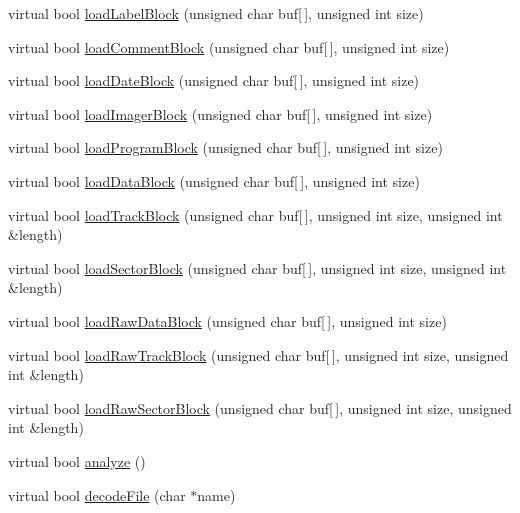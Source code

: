 \begin{DoxyCompactItemize}
\item 
virtual bool \hyperlink{classH17Disk_a3a4c239c85de3b29d6d89c8854c8ed9b}{load\+Label\+Block} (unsigned char buf\mbox{[}$\,$\mbox{]}, unsigned int size)
\item 
virtual bool \hyperlink{classH17Disk_a4b28a58f502aedd83052dbbba759ba28}{load\+Comment\+Block} (unsigned char buf\mbox{[}$\,$\mbox{]}, unsigned int size)
\item 
virtual bool \hyperlink{classH17Disk_a06965b624586dda02e6a1cf7ebf53984}{load\+Date\+Block} (unsigned char buf\mbox{[}$\,$\mbox{]}, unsigned int size)
\item 
virtual bool \hyperlink{classH17Disk_a6183e4e35db3b2ae16a9322f377556e4}{load\+Imager\+Block} (unsigned char buf\mbox{[}$\,$\mbox{]}, unsigned int size)
\item 
virtual bool \hyperlink{classH17Disk_aead615d628b0e4c68f69bd746aeabdb1}{load\+Program\+Block} (unsigned char buf\mbox{[}$\,$\mbox{]}, unsigned int size)
\item 
virtual bool \hyperlink{classH17Disk_a36b7999d189ddc7dc05ba9adcbf3b946}{load\+Data\+Block} (unsigned char buf\mbox{[}$\,$\mbox{]}, unsigned int size)
\item 
virtual bool \hyperlink{classH17Disk_a22308e6d39b0bcb15b6234ea12f61a60}{load\+Track\+Block} (unsigned char buf\mbox{[}$\,$\mbox{]}, unsigned int size, unsigned int \&length)
\item 
virtual bool \hyperlink{classH17Disk_ac9e769a95201984cd0dfae38a7a6d80a}{load\+Sector\+Block} (unsigned char buf\mbox{[}$\,$\mbox{]}, unsigned int size, unsigned int \&length)
\item 
virtual bool \hyperlink{classH17Disk_a31ecffc2c61fe921e9a2ef4018ce5c99}{load\+Raw\+Data\+Block} (unsigned char buf\mbox{[}$\,$\mbox{]}, unsigned int size)
\item 
virtual bool \hyperlink{classH17Disk_abc735f36c5a4ab5f1a7d418639fda508}{load\+Raw\+Track\+Block} (unsigned char buf\mbox{[}$\,$\mbox{]}, unsigned int size, unsigned int \&length)
\item 
virtual bool \hyperlink{classH17Disk_a7fc528a2dc311ed9e614a1b212017033}{load\+Raw\+Sector\+Block} (unsigned char buf\mbox{[}$\,$\mbox{]}, unsigned int size, unsigned int \&length)
\item 
virtual bool \hyperlink{classH17Disk_aa6f27c9eaafd2242fd90ff28f19140ca}{analyze} ()
\item 
virtual bool \hyperlink{classH17Disk_a503d2a03bfe0f9bbe3a8bd8dc7d2ec17}{decode\+File} (char $\ast$name)
\item 

\end{DoxyCompactItemize}
